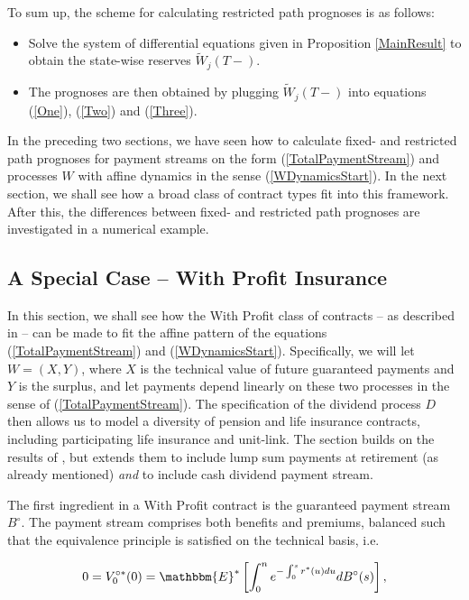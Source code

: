 \documentclass{article}
\newcommand{\1}[1]{\mathbbm{1}_{\left\lbrace #1 \right\rbrace}}
\newcommand{\expecStar}[1][def]{\mathbbm{E}^* \left[ #1 \right]}
\theoremstyle{break}
\theoremstyle{remark}
\numberwithin{equation}{section}
\begin{document}
To sum up, the scheme for calculating restricted path prognoses is as follows:

\begin{itemize}
	\item Solve the system of differential equations given in Proposition \ref{MainResult} to obtain the state-wise reserves $\tilde{W}_j(T-)$.
	\item The prognoses are then obtained by plugging $\tilde{W}_j(T-)$ into equations (\ref{One}), (\ref{Two}) and (\ref{Three}).
\end{itemize}



In the preceding two sections, we have seen how to calculate fixed- and restricted path prognoses for payment streams on the form (\ref{TotalPaymentStream}) and processes $W$ with affine dynamics in the sense (\ref{WDynamicsStart}). In the next section, we shall see how a broad class of contract types fit into this framework. After this, the differences between fixed- and restricted path prognoses are investigated in a numerical example.

\newpage
\subsection{A Special Case -- With Profit Insurance} \label{WithProfit}

In this section, we shall see how the With Profit class of contracts -- as described in \cite{Liv2Bog} -- can be made to fit the affine pattern of the equations (\ref{TotalPaymentStream}) and (\ref{WDynamicsStart}). Specifically, we will let $W=(X,Y)$, where $X$ is the technical value of future guaranteed payments and $Y$ is the surplus, and let payments depend linearly on these two processes in the sense of (\ref{TotalPaymentStream}). The specification of the dividend process $D$ then allows us to model a diversity of pension and life insurance contracts, including participating life insurance and unit-link. The section builds on the results of \cite{Lollike}, but extends them to include lump sum payments at retirement (as already mentioned) \textit{and} to include cash dividend payment stream.

The first ingredient in a With Profit contract is the guaranteed payment stream $B^\circ$. The payment stream comprises both benefits and premiums, balanced such that the equivalence principle is satisfied on the technical basis, i.e.

\begin{align*}
0 = V_0^{\circ*}(0) = \expecStar[\int_0^n e^{-\int_0^s r^*(u) du} dB^\circ(s)],
\end{align*}
\end{document}
